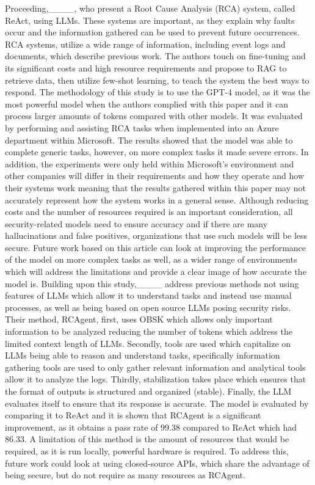 Proceeding,____, who present a Root Cause Analysis (RCA) system, called ReAct, using LLMs. These systems are important, as they explain why faults occur and the information gathered can be used to prevent future occurrences. RCA systems, utilize a wide range of information, including event logs and documents, which describe previous work. The authors touch on fine-tuning and its significant costs and high resource requirements and propose to RAG to retrieve data, then utilize few-shot learning, to teach the system the best ways to respond. The methodology of this study is to use the GPT-4 model, as it was the most powerful model when the authors complied with this paper and it can process larger amounts of tokens compared with other models. It was evaluated by performing and assisting RCA tasks when implemented into an Azure department within Microsoft. The results showed that the model was able to complete generic tasks, however, on more complex tasks it made severe errors. In addition, the experiments were only held within Microsoft’s environment and other companies will differ in their requirements and how they operate and how their systems work meaning that the results gathered within this paper may not accurately represent how the system works in a general sense. Although reducing costs and the number of resources required is an important consideration, all security-related models need to ensure accuracy and if there are many hallucinations and false positives, organizations that use such models will be less secure. Future work based on this article can look at improving the performance of the model on more complex tasks as well, as a wider range of environments which will address the limitations and provide a clear image of how accurate the model is. Building upon this study,____ address previous methods not using features of LLMs which allow it to understand tasks and instead use manual processes, as well as being based on open source LLMs posing security risks. Their method, RCAgent, first, uses OBSK which allows only important information to be analyzed reducing the number of tokens which address the limited context length of LLMs. Secondly, tools are used which capitalize on LLMs being able to reason and understand tasks, specifically information gathering tools are used to only gather relevant information and analytical tools allow it to analyze the logs. Thirdly, stabilization takes place which ensures that the format of outputs is structured and organized (stable). Finally, the LLM evaluates itself to ensure that its response is accurate. The model is evaluated by comparing it to ReAct and it is shown that RCAgent is a significant improvement, as it obtains a pass rate of 99.38 compared to ReAct which had 86.33. A limitation of this method is the amount of resources that would be required, as it is run locally, powerful hardware is required. To address this, future work could look at using closed-source APIs, which share the advantage of being secure, but do not require as many resources as RCAgent.

